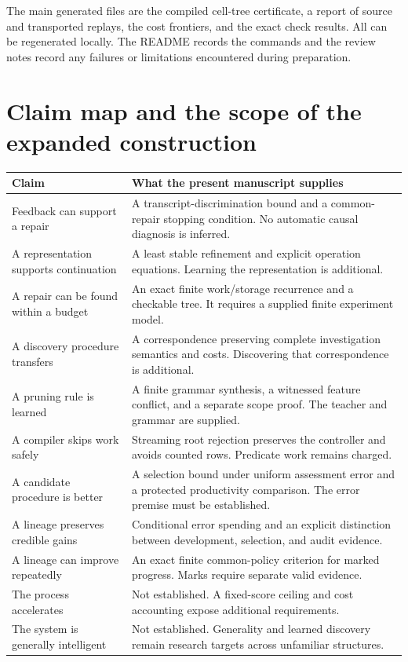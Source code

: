 \documentclass[11pt,letterpaper]{article}
\theoremstyle{plain}
\theoremstyle{definition}
\begin{document}
The main generated files are the compiled cell-tree certificate, a report of source and transported replays, the cost frontiers, and the exact check results. All can be regenerated locally. The README records the commands and the review notes record any failures or limitations encountered during preparation.

\section{Claim map and the scope of the expanded construction}\label{app:claimmap}
\begin{small}\begin{longtable}{@{}p{}p{}@{}}\toprule
Claim & What the present manuscript supplies\\\midrule\endhead
Feedback can support a repair & A transcript-discrimination bound and a common-repair stopping condition. No automatic causal diagnosis is inferred.\\
A representation supports continuation & A least stable refinement and explicit operation equations. Learning the representation is additional.\\
A repair can be found within a budget & An exact finite work/storage recurrence and a checkable tree. It requires a supplied finite experiment model.\\
A discovery procedure transfers & A correspondence preserving complete investigation semantics and costs. Discovering that correspondence is additional.\\
A pruning rule is learned & A finite grammar synthesis, a witnessed feature conflict, and a separate scope proof. The teacher and grammar are supplied.\\
A compiler skips work safely & Streaming root rejection preserves the controller and avoids counted rows. Predicate work remains charged.\\
A candidate procedure is better & A selection bound under uniform assessment error and a protected productivity comparison. The error premise must be established.\\
A lineage preserves credible gains & Conditional error spending and an explicit distinction between development, selection, and audit evidence.\\
A lineage can improve repeatedly & An exact finite common-policy criterion for marked progress. Marks require separate valid evidence.\\
The process accelerates & Not established. A fixed-score ceiling and cost accounting expose additional requirements.\\
The system is generally intelligent & Not established. Generality and learned discovery remain research targets across unfamiliar structures.\\\bottomrule
\end{longtable}\end{small}
\end{document}
